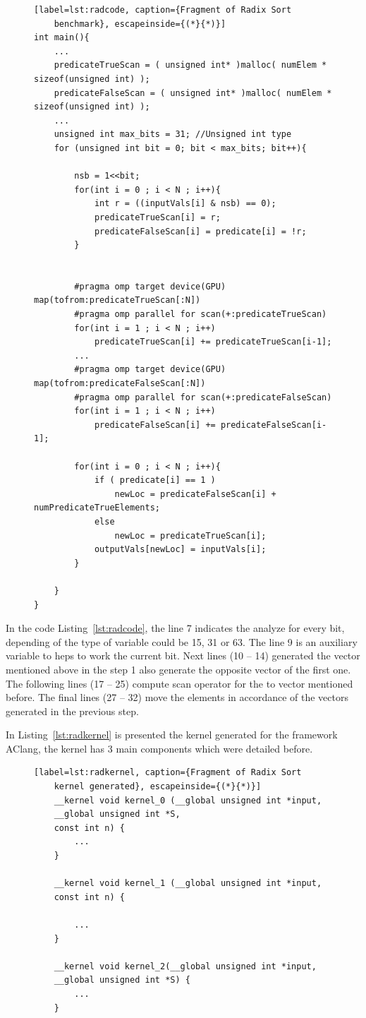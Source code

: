 \documentclass[Ingles]{ic-tese-v1}
\newcommand{\rlst}[1]{Listing~\ref{lst:#1}}
\begin{document}
\begin{figure}[t]
	\lstset{basicstyle=\scriptsize}
	\begin{lstlisting}[label=lst:radcode, caption={Fragment of Radix Sort
	benchmark}, escapeinside={(*}{*)}]
int main(){
	...
	predicateTrueScan = ( unsigned int* )malloc( numElem * sizeof(unsigned int) );
	predicateFalseScan = ( unsigned int* )malloc( numElem * sizeof(unsigned int) );
	...
	unsigned int max_bits = 31; //Unsigned int type
	for (unsigned int bit = 0; bit < max_bits; bit++){

		nsb = 1<<bit;
		for(int i = 0 ; i < N ; i++){
			int r = ((inputVals[i] & nsb) == 0);
			predicateTrueScan[i] = r;
			predicateFalseScan[i] = predicate[i] = !r;
		}


		#pragma omp target device(GPU) map(tofrom:predicateTrueScan[:N])
		#pragma omp parallel for scan(+:predicateTrueScan)
		for(int i = 1 ; i < N ; i++)
			predicateTrueScan[i] += predicateTrueScan[i-1];
		...
		#pragma omp target device(GPU) map(tofrom:predicateFalseScan[:N])
		#pragma omp parallel for scan(+:predicateFalseScan)
		for(int i = 1 ; i < N ; i++)
			predicateFalseScan[i] += predicateFalseScan[i-1];

		for(int i = 0 ; i < N ; i++){
			if ( predicate[i] == 1 )
				newLoc = predicateFalseScan[i] + numPredicateTrueElements;
			else
				newLoc = predicateTrueScan[i];
			outputVals[newLoc] = inputVals[i];
		}

	}
}
	\end{lstlisting}
\end{figure}

In the code \rlst{radcode}, the line 7 indicates the analyze for every bit, depending of the
type of variable could be 15, 31 or 63. The line 9 is an auxiliary variable to heps
to work the current bit. Next lines (10 -- 14) generated the vector mentioned above
in the step 1 also generate the opposite vector of the first one. The following lines
(17 -- 25) compute scan operator for the to vector mentioned before. The final lines
(27 -- 32) move the elements in accordance of the vectors generated in the previous step.

In \rlst{radkernel} is presented the kernel generated for the framework AClang,
the kernel has 3 main components which were detailed before.

\begin{figure}[t]
	\lstset{basicstyle=\scriptsize}
	\begin{lstlisting}[label=lst:radkernel, caption={Fragment of Radix Sort
	kernel generated}, escapeinside={(*}{*)}]
	__kernel void kernel_0 (__global unsigned int *input,
	__global unsigned int *S,
	const int n) {
		...
	}

	__kernel void kernel_1 (__global unsigned int *input,
	const int n) {

		...
	}

	__kernel void kernel_2(__global unsigned int *input,
	__global unsigned int *S) {
		...
	}
	\end{lstlisting}
\end{figure}
\end{document}
